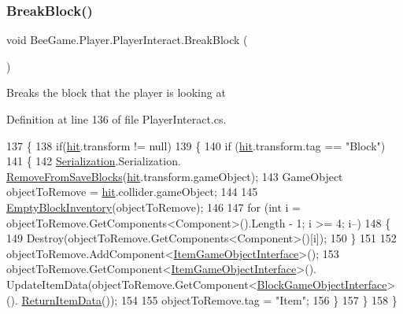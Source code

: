 \subsubsection{\texorpdfstring{Break\+Block()}{BreakBlock()}}
{\footnotesize\ttfamily void Bee\+Game.\+Player.\+Player\+Interact.\+Break\+Block (\begin{DoxyParamCaption}{ }\end{DoxyParamCaption})\hspace{0.3cm}{\ttfamily [private]}}



Breaks the block that the player is looking at 



Definition at line 136 of file Player\+Interact.\+cs.


\begin{DoxyCode}
137         \{
138             \textcolor{keywordflow}{if}(\hyperlink{class_bee_game_1_1_player_1_1_player_interact_a39537118b4601a3596122f124b684024}{hit}.transform != null)
139             \{
140                 \textcolor{keywordflow}{if} (\hyperlink{class_bee_game_1_1_player_1_1_player_interact_a39537118b4601a3596122f124b684024}{hit}.transform.tag == \textcolor{stringliteral}{"Block"})
141                 \{
142                     \hyperlink{class_bee_game_1_1_serialization_1_1_serialization}{Serialization}.Serialization.
      \hyperlink{class_bee_game_1_1_serialization_1_1_serialization_a248f000bbdc4c3dad2f03018d63fbb9f}{RemoveFromSaveBlocks}(\hyperlink{class_bee_game_1_1_player_1_1_player_interact_a39537118b4601a3596122f124b684024}{hit}.transform.gameObject);
143                     GameObject objectToRemove = \hyperlink{class_bee_game_1_1_player_1_1_player_interact_a39537118b4601a3596122f124b684024}{hit}.collider.gameObject;
144 
145                     \hyperlink{class_bee_game_1_1_player_1_1_player_interact_a5e24c97ecd41cfaceaf71d08409d8cca}{EmptyBlockInventory}(objectToRemove);
146 
147                     \textcolor{keywordflow}{for} (\textcolor{keywordtype}{int} i = objectToRemove.GetComponents<Component>().Length - 1; i >= 4; i--)
148                     \{
149                         Destroy(objectToRemove.GetComponents<Component>()[i]);
150                     \}
151 
152                     objectToRemove.AddComponent<\hyperlink{class_bee_game_1_1_items_1_1_item_game_object_interface}{ItemGameObjectInterface}>();
153                     objectToRemove.GetComponent<\hyperlink{class_bee_game_1_1_items_1_1_item_game_object_interface}{ItemGameObjectInterface}>().
      UpdateItemData(objectToRemove.GetComponent<\hyperlink{class_bee_game_1_1_blocks_1_1_block_game_object_interface}{BlockGameObjectInterface}>().
      \hyperlink{class_bee_game_1_1_blocks_1_1_block_game_object_interface_a224ae292be961a0c3b7675e5a85ddb1b}{ReturnItemData}());
154 
155                     objectToRemove.tag = \textcolor{stringliteral}{"Item"};
156                 \}
157             \}
158         \}
\end{DoxyCode}
